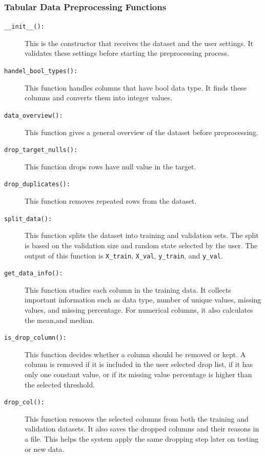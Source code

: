 \documentclass[12pt,a4paper]{report}
\begin{document}
\subsubsection{Tabular Data Preprocessing Functions}


\begin{description}
    \item[\texttt{\_\_init\_\_():}]
    This is the constructor that receives the dataset and the user settings. 
    It validates these settings before starting the preprocessing process. 
    \item[\texttt{handel\_bool\_types():}]
    This function handles columns that have bool data type. It finds these columns and converts them into integer values.

    \item[\texttt{data\_overview():}]
    This function gives a general overview of the dataset before preprocessing.
    \item[\texttt{drop\_target\_nulls():}]
    This function drops rows have null value in the target.

    \item[\texttt{drop\_duplicates():}]
    This function removes repeated rows from the dataset.

    \item[\texttt{split\_data():}]
    This function splits the dataset into training and validation sets. The split is
    based on the validation size and random state selected by the user. The output of
    this function is \texttt{X\_train}, \texttt{X\_val}, \texttt{y\_train}, and
    \texttt{y\_val}.

    \item[\texttt{get\_data\_info():}]
    This function studies each column in the training data. It collects important
    information such as data type, number of unique values,
    missing values, and missing percentage. For numerical columns, it also calculates the mean,and median.

    \item[\texttt{is\_drop\_column():}]
    This function decides whether a column should be removed or kept. A column is
    removed if it is included in the user selected drop list, if it has only one constant
    value, or if its missing value percentage is higher than the selected threshold. 
    \item[\texttt{drop\_col():}]
    This function removes the selected columns from both the training and validation
    datasets. It also saves the dropped columns and their reasons in a file. This helps
    the system apply the same dropping step later on testing or new data.


\end{description}
\end{document}
